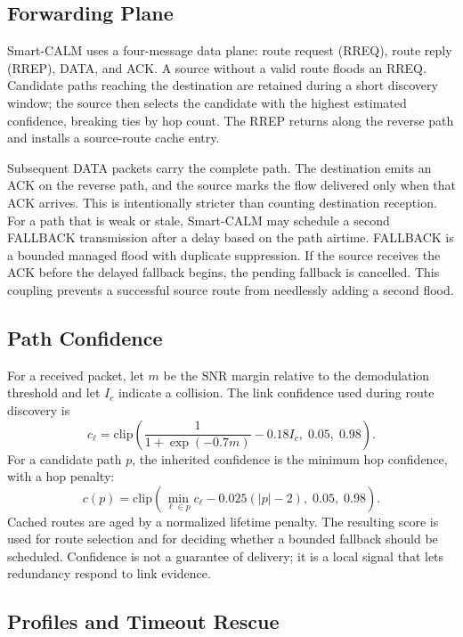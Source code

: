 \documentclass[10pt,conference,letterpaper]{IEEEtran}
\begin{document}
\subsection{Forwarding Plane}

Smart-CALM uses a four-message data plane: route request (RREQ), route reply
(RREP), DATA, and ACK. A source without a valid route floods an RREQ. Candidate
paths reaching the destination are retained during a short discovery window;
the source then selects the candidate with the highest estimated confidence,
breaking ties by hop count. The RREP returns along the reverse path and
installs a source-route cache entry.


Subsequent DATA packets carry the complete path. The destination emits an ACK
on the reverse path, and the source marks the flow delivered only when that ACK
arrives. This is intentionally stricter than counting destination reception.
For a path that is weak or stale, Smart-CALM may schedule a second FALLBACK
transmission after a delay based on the path airtime. FALLBACK is a bounded
managed flood with duplicate suppression. If the source receives the ACK
before the delayed fallback begins, the pending fallback is cancelled. This
coupling prevents a successful source route from needlessly adding a second
flood.


\subsection{Path Confidence}

For a received packet, let $m$ be the SNR margin relative to the demodulation
threshold and let $I_c$ indicate a collision. The link confidence used during
route discovery is
\begin{equation}
 c_{\ell} = \mathrm{clip}\left(
 \frac{1}{1+\exp(-0.7m)} - 0.18 I_c,\;0.05,\;0.98\right).
\end{equation}
For a candidate path $p$, the inherited confidence is the minimum hop
confidence, with a hop penalty:
\begin{equation}
 c(p) = \mathrm{clip}\left(
 \min_{\ell\in p}c_{\ell} - 0.025(|p|-2),\;0.05,\;0.98\right).
\end{equation}
Cached routes are aged by a normalized lifetime penalty. The resulting score
is used for route selection and for deciding whether a bounded fallback should
be scheduled. Confidence is not a guarantee of delivery; it is a local signal
that lets redundancy respond to link evidence.


\subsection{Profiles and Timeout Rescue}
\end{document}
